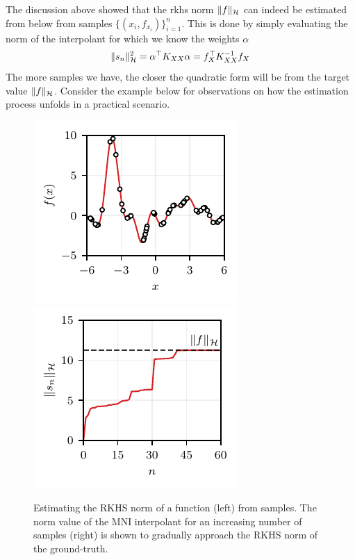 The discussion above showed that the \ac{rkhs} norm $\Vert f \Vert_{\mathcal{H}}$ can indeed be estimated from below from samples $\{(x_i,f_{x_i})\}_{i=1}^n$. This is done by simply evaluating the norm of the interpolant for which we know the weights $\alpha$
\begin{equation}
\Vert s_n \Vert_{\mathcal{H}}^2 = \alpha^\top K_{XX} \alpha = f_{X}^\top K_{XX}^{-1} f_{X}
\end{equation}
The more samples we have, the closer the quadratic form will be from the target value $\Vert f \Vert_{\mathcal{H}}$. Consider the example below for observations on how the estimation process unfolds in a practical scenario.

\begin{figure}[b]
	\centering
	\includegraphics[scale=1]{../images/norm_est.pdf} 
	\includegraphics[scale=1]{../images/norm_value.pdf} %
	\caption{Estimating the RKHS norm of a function (left) from samples. The norm value of the MNI interpolant for an increasing number of samples (right) is shown to gradually approach the RKHS norm of the ground-truth.}
	\label{fig.appendice_norm_estimation}
\end{figure}

